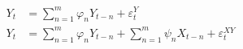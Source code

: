 \documentclass[margin=6]{standalone}
\begin{document}
    $
    \begin{aligned}
        Y_t&=\sum_{n=1}^m\varphi_n Y_{t-n}+\varepsilon_t^Y\\
        Y_t&=\sum_{n=1}^m\varphi_n Y_{t-n}+\sum_{n=1}^m\psi_nX_{t-n}+\varepsilon_t^{XY}
    \end{aligned}
    $
\end{document}

